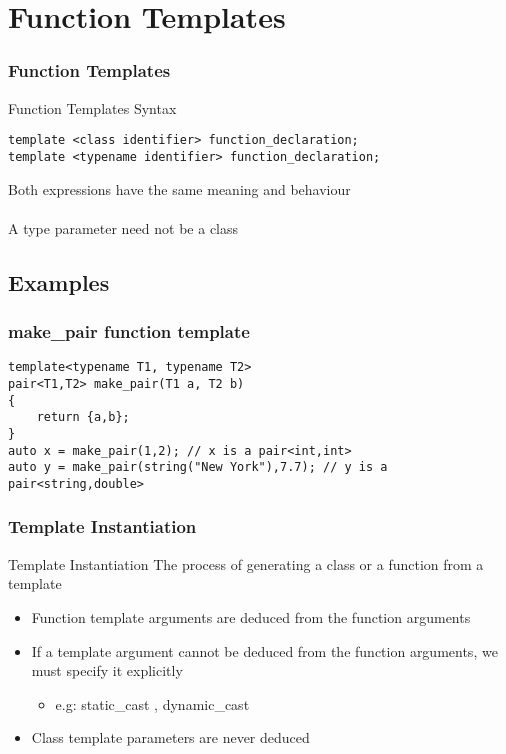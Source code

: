 \documentclass{beamer}
\begin{document}
\section{Function Templates}
\begin{frame}[fragile]
\frametitle{Function Templates}

\begin{block}{Function Templates Syntax}
\begin{lstlisting}
template <class identifier> function_declaration;
template <typename identifier> function_declaration;
\end{lstlisting}
\end{block}

Both expressions have the same meaning and behaviour\\~\\

A type parameter need not be a class
\end{frame}

\subsection{Examples}
\begin{frame}[fragile]
\frametitle{make\_pair function template}

\begin{lstlisting}
template<typename T1, typename T2>
pair<T1,T2> make_pair(T1 a, T2 b)
{
    return {a,b};
}
auto x = make_pair(1,2); // x is a pair<int,int>
auto y = make_pair(string("New York"),7.7); // y is a pair<string,double>

\end{lstlisting}
\end{frame}


\begin{frame}
\frametitle{Template Instantiation}

\begin{block}{Template Instantiation}
The process of generating a class or a function from a template
\end{block}
\begin{itemize}
\item Function template arguments are deduced from the function arguments
\item If a template argument cannot be deduced from the function arguments, we must specify
it explicitly
    \begin{itemize}
    \item e.g: static\_cast , dynamic\_cast 
    \end{itemize}
\item Class template parameters are never deduced
\end{itemize}
\end{frame}
\end{document}
